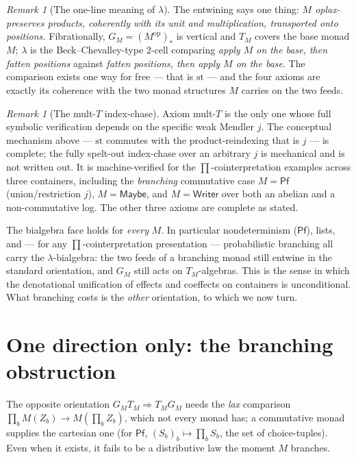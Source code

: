 \documentclass[11pt]{amsart}
\theoremstyle{plain}
\theoremstyle{definition}
\theoremstyle{remark}
\newtheorem{remark}[theorem]{Remark}
\newcommand{\op}{\mathrm{op}}
\newcommand{\str}{\mathrm{st}}
\newcommand{\Maybe}{\mathsf{Maybe}}
\newcommand{\Pf}{\mathsf{Pf}}
\newcommand{\Writer}{\mathsf{Writer}}
\begin{document}
\begin{remark}[The one-line meaning of $\lambda$]
The entwining says one thing: \emph{$M$ oplax-preserves products, coherently with its unit
and multiplication, transported onto positions.} Fibrationally, $G_M=(M^\op)_*$ is vertical
and $T_M$ covers the base monad $M$; $\lambda$ is the Beck--Chevalley-type $2$-cell comparing
\emph{apply $M$ on the base, then fatten positions} against \emph{fatten positions, then apply
$M$ on the base}. The comparison exists one way for free --- that is $\str$ --- and the four
axioms are exactly its coherence with the two monad structures $M$ carries on the two feeds.
\end{remark}

\begin{remark}[The mult-$T$ index-chase]\label{rem:e2gap}
Axiom mult-$T$ is the only one whose full symbolic verification depends on the specific weak
Mendler $j$. The conceptual mechanism above --- $\str$ commutes with the product-reindexing
that is $j$ --- is complete; the fully spelt-out index-chase over an arbitrary $j$ is
mechanical and is not written out. It is machine-verified for the $\prod$-cointerpretation
examples across three containers, including the \emph{branching} commutative case $M=\Pf$
(union/restriction $j$), $M=\Maybe$, and $M=\Writer$ over both an abelian and a
non-commutative log. The other three axioms are complete as stated.
\end{remark}

The bialgebra face holds for \emph{every} $M$. In particular nondeterminism ($\Pf$),
lists, and --- for any $\prod$-cointerpretation presentation --- probabilistic branching all
carry the $\lambda$-bialgebra: the two feeds of a branching monad still entwine in the
standard orientation, and $G_M$ still acts on $T_M$-algebras. This is the sense in which the
denotational unification of effects and coeffects on containers is unconditional. What
branching costs is the \emph{other} orientation, to which we now turn.

\section{One direction only: the branching obstruction}\label{sec:onedirection}

The opposite orientation $G_M T_M\Rightarrow T_M G_M$ needs the \emph{lax} comparison
$\prod_b M(Z_b)\to M(\prod_b Z_b)$, which not every monad has; a commutative monad supplies
the cartesian one (for $\Pf$, $(S_b)_b\mapsto\prod_b S_b$, the set of choice-tuples). Even
when it exists, it fails to be a distributive law the moment $M$ branches.
\end{document}
